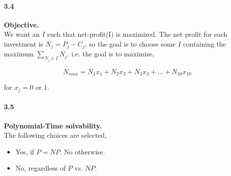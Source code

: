 \documentclass{article}
\begin{document}
\paragraph*{3.4} \textbf{Objective.} \\

\noindent
We want an $I$ such that net-profit(I) is maximized. The net profit for each investment is $N_j = P_j - C_j$, so the goal is to choose some
$I$ containing the maximum $\sum_{N_j \in I} N_j$.
i.e. the goal is to maximize,

$$N_{max} = N_1x_1 + N_2x_2 + N_3x_3 + ... + N_{10}x_{10}$$

for $x_j = 0$ or $1$.

\paragraph*{3.5} \textbf{Polynomial-Time solvability.} \\
\noindent
The following choices are selected,

\begin{itemize}
\item Yes, if $P = NP$. No otherwise.
\item No, regardless of $P$ vs. $NP$.
\end{itemize}
\end{document}
